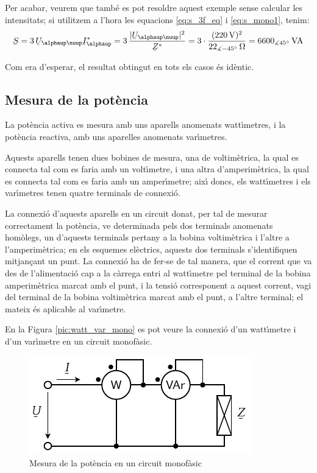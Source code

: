 \begin{exemple}
    Per acabar, veurem que tamb\'{e} es pot resoldre aquest exemple
    sense calcular les intensitats; si utilitzem a l'hora les
    equacions \eqref{eq:s_3f_eq} i \eqref{eq:s_mono1}, tenim:
    \[
    \cmplx{S} = 3\,\cmplx{U}_{\alphaup\nuup} \cmplx{I}_\alphaup^* = 3\,
    \frac{|\cmplx{U}_{\alphaup\nuup}|^2}{\cmplx{Z}^*} =
    3\cdot\frac{(220\unit{V})^2}{22_{\measuredangle
    -45\degree}\unit{\ohm}} = 6600_{\measuredangle 45\degree}\unit{VA}
    \]

    Com era d'esperar, el resultat obtingut en tots els casos
    \'{e}s id\`{e}ntic.
\end{exemple}

\subsection{Mesura de la pot\`{e}ncia}

La pot\`{e}ncia activa es mesura amb uns aparells anomenats watt\'{\i}metres,
i la pot\`{e}ncia reactiva, amb uns aparelles anomenats var\'{\i}metres.

Aquests aparells tenen dues bobines de mesura, una de voltim\`{e}trica,
la qual es connecta tal com es faria amb un volt\'{\i}metre, i una altra
d'amperim\`{e}trica, la qual es connecta tal com es faria amb un
amper\'{\i}metre; aix\'{\i} doncs, els watt\'{\i}metres i els var\'{\i}metres tenen
quatre terminals de connexi\'{o}.

La connexi\'{o} d'aquests aparells en un circuit donat, per tal de
mesurar correctament la pot\`{e}ncia, ve determinada pels dos terminals
anomenats hom\`{o}legs, un d'aquests terminals pertany a la bobina
voltim\`{e}trica i l'altre a l'amperim\`{e}trica; en els esquemes el\`{e}ctrics,
aquests dos terminals s'identifiquen mitjan\c{c}ant un punt. La connexi\'{o}
ha de fer-se de tal manera, que el corrent que va des de
l'alimentaci\'{o} cap a la c\`{a}rrega entri al watt\'{\i}metre pel terminal de
la bobina amperim\`{e}trica marcat amb el punt, i la tensi\'{o} corresponent
a aquest corrent, vagi del terminal de la bobina voltim\`{e}trica marcat
amb el punt, a l'altre terminal; el mateix \'{e}s aplicable al
var\'{\i}metre.

En la Figura \vref{pic:watt_var_mono} es pot veure la connexi\'{o} d'un
watt\'{\i}metre i d'un var\'{\i}metre en un circuit monof\`{a}sic.


\begin{figure}[h]
\centering
    \includegraphics{Imatges/Cap-Fonaments-Mesura-Potencia-Monof.pdf}
\caption{Mesura de la pot\`{e}ncia en un circuit  monof\`{a}sic}
\label{pic:watt_var_mono}
\end{figure}


